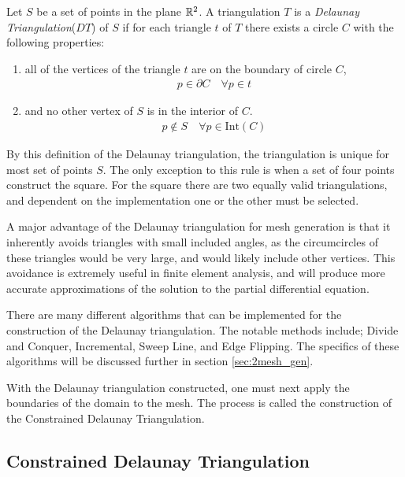 \documentclass[../fem.tex]{subfile}
\begin{document}
\begin{definition}
   Let $S$ be a set of points in the plane $\mathbb{R}^2$. A triangulation $T$ is a
   \textit{Delaunay Triangulation}($DT$) of $S$ if for each triangle $t$ of $T$
   there exists a circle $C$ with the following properties:
   \begin{enumerate}
     \item all of the vertices of the triangle $t$ are on the boundary of
       circle $C$,
       \begin{align*}
          p\in\partial C\quad\forall p\in t
       \end{align*}
     \item and no other vertex of $S$ is in the interior of $C$.
       \begin{align*}
         p\notin S\quad\forall p\in\text{Int}(C)
       \end{align*}
   \end{enumerate}
\end{definition}

By this definition of the Delaunay triangulation, the triangulation is unique
for most set of points $S$. The only exception to this rule is when a set of
four points construct the square. For the square there are two equally valid
triangulations, and dependent on the implementation one or the other must be
selected.

A major advantage of the Delaunay triangulation for mesh generation is that it
inherently avoids triangles with small included angles, as the circumcircles of
these triangles would be very large, and would likely include other vertices.
This avoidance is extremely useful in finite element analysis, and will produce
more accurate approximations of the solution to the partial differential
equation.

There are many different algorithms that can be implemented for the
construction of the Delaunay triangulation. The notable methods include; Divide
and Conquer, Incremental, Sweep Line, and Edge Flipping. The specifics of these
algorithms will be discussed further in section \ref{sec:2mesh_gen}.

With the Delaunay triangulation constructed, one must next apply the boundaries
of the domain to the mesh. The process is called the construction of the
Constrained Delaunay Triangulation.

\subsection{Constrained Delaunay Triangulation}%
\label{sub:constrained_delaunay_triangulation}
\end{document}

